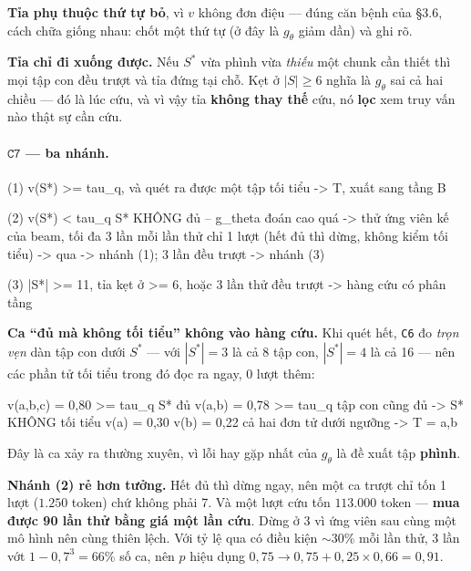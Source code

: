 \documentclass[11pt,a4paper]{article}
\begin{document}
\textbf{Tỉa phụ thuộc thứ tự bỏ}, vì $v$ không đơn điệu --- đúng căn bệnh của \S3.6, cách chữa
giống nhau: chốt một thứ tự (ở đây là $g_\theta$ giảm dần) và ghi rõ.

\textbf{Tỉa chỉ đi xuống được.} Nếu $S^*$ vừa phình vừa \emph{thiếu} một chunk cần thiết thì
mọi tập con đều trượt và tỉa đứng tại chỗ. Kẹt ở $|S|\ge 6$ nghĩa là $g_\theta$ sai cả hai
chiều --- đó là lúc cứu, và vì vậy tỉa \textbf{không thay thế} cứu, nó \textbf{lọc} xem truy
vấn nào thật sự cần cứu.

\paragraph{$\mathtt{C7}$ --- ba nhánh.}

\begin{dia}
(1) v(S*) >= tau_q, và quét ra được một tập tối tiểu
        ->  T, xuất sang tầng B

(2) v(S*) < tau_q                      S* KHÔNG đủ -- g_theta đoán cao quá
        ->  thử ứng viên kế của beam, tối đa 3 lần
            mỗi lần thử chỉ 1 lượt (hết đủ thì dừng, không kiểm tối tiểu)
        ->  qua -> nhánh (1);   3 lần đều trượt -> nhánh (3)

(3) |S*| >= 11,  tỉa kẹt ở >= 6,  hoặc 3 lần thử đều trượt
        ->  hàng cứu có phân tầng
\end{dia}

\textbf{Ca ``đủ mà không tối tiểu'' không vào hàng cứu.} Khi quét hết, \texttt{C6} đo
\emph{trọn vẹn} dàn tập con dưới $S^*$ --- với $|S^*|=3$ là cả 8 tập con, $|S^*|=4$ là cả 16
--- nên các phần tử tối tiểu trong đó đọc ra ngay, 0 lượt thêm:

\begin{dia}
v({a,b,c}) = 0,80 >= tau_q      S* đủ
v({a,b})   = 0,78 >= tau_q      tập con cũng đủ  ->  S* KHÔNG tối tiểu
v({a}) = 0,30   v({b}) = 0,22   cả hai đơn tử dưới ngưỡng
->  T = {a,b}
\end{dia}

Đây là ca xảy ra thường xuyên, vì lỗi hay gặp nhất của $g_\theta$ là đề xuất tập \textbf{phình}.

\textbf{Nhánh (2) rẻ hơn tưởng.} Hết đủ thì dừng ngay, nên một ca trượt chỉ tốn 1 lượt
($1.250$ token) chứ không phải 7. Và một lượt cứu tốn $113.000$ token --- \textbf{mua được 90
lần thử bằng giá một lần cứu}. Dừng ở 3 vì ứng viên sau cùng một mô hình nên cùng thiên lệch.
Với tỷ lệ qua có điều kiện ${\sim}30\%$ mỗi lần thử, 3 lần vớt $1-0{,}7^3=66\%$ số ca, nên
$p$ hiệu dụng $0{,}75\to 0{,}75+0{,}25\times0{,}66=0{,}91$.
\end{document}
